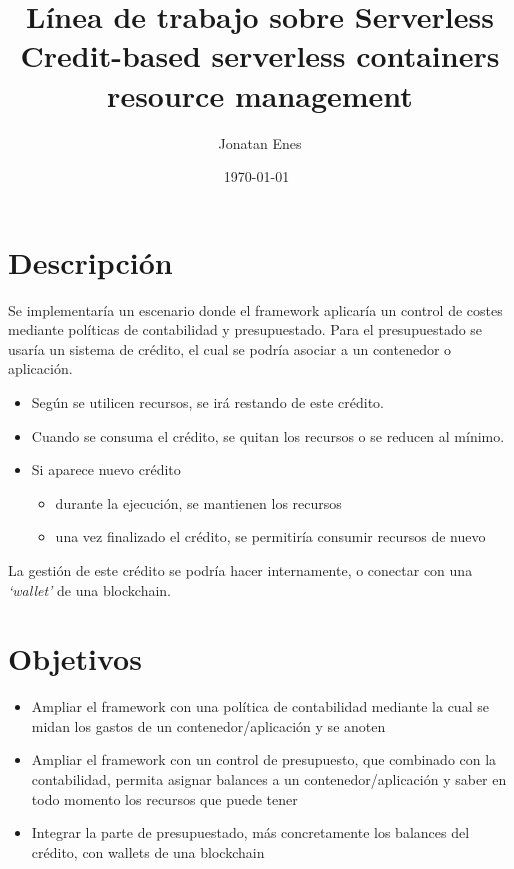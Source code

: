 \documentclass[12pt]{extarticle}
\title{Línea de trabajo sobre Serverless\\ {\large Credit-based serverless containers resource management}}
\author{Jonatan Enes}
\date{\today~\currenttime}
\begin{document}
    \maketitle

    \tableofcontents

    \section{Descripción}

    Se implementaría un escenario donde el framework aplicaría un control de costes mediante políticas de contabilidad y presupuestado.
    Para el presupuestado se usaría un sistema de crédito, el cual se podría asociar a un contenedor o aplicación.

    \begin{itemize}
        \item Según se utilicen recursos, se irá restando de este crédito.
        \item Cuando se consuma el crédito, se quitan los recursos o se reducen al mínimo.
        \item Si aparece nuevo crédito
        \begin{itemize}
            \item durante la ejecución, se mantienen los recursos
            \item una vez finalizado el crédito, se permitiría consumir recursos de nuevo
        \end{itemize}
    \end{itemize}

    La gestión de este crédito se podría hacer internamente, o conectar con una \textit{`wallet'} de una blockchain.

    \section{Objetivos}
    \begin{itemize}
        \item Ampliar el framework con una política de contabilidad mediante la cual se midan los gastos de un contenedor/aplicación y se anoten
        \item Ampliar el framework con un control de presupuesto, que combinado con la contabilidad, permita asignar balances a un contenedor/aplicación y saber en todo momento los recursos que puede tener
        \item Integrar la parte de presupuestado, más concretamente los balances del crédito, con wallets de una blockchain
    \end{itemize}
\end{document}
